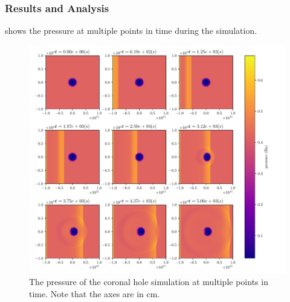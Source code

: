 \documentclass[a4paper]{article}
\numberwithin{figure}{section}
\numberwithin{equation}{section}
\begin{document}
\subsubsection{Results and Analysis} \label{sec:results_and_analysis}
 shows the pressure at multiple points in time during the simulation.
\begin{figure}[h]
	\centering
	\includegraphics[width=1\textwidth]{figures/hole_time.pdf}
	\caption{The pressure of the coronal hole simulation at multiple points in time. Note that the axes are in \si{\centi\metre}.}
	\label{fig:hole}
\end{figure}
\end{document}
